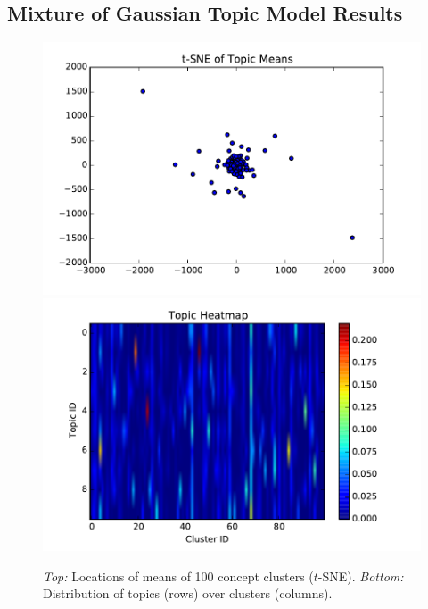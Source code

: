 \documentclass[11pt]{article}
\begin{document}
\subsection{Mixture of Gaussian Topic Model Results}

\begin{figure}
\centering
\includegraphics[width=\columnwidth]{assets/gtm100_mu_tsne.pdf}
\includegraphics[width=\columnwidth]{assets/gtm100_topic_heatmap.pdf}
\caption{\emph{Top:} Locations of means of 100 concept clusters ($t$-SNE). \emph{Bottom:} Distribution of topics (rows) over clusters (columns).}
\end{figure}
\end{document}
